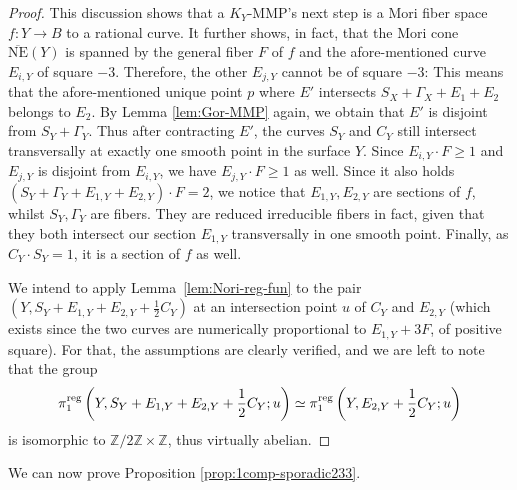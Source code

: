 \documentclass{amsart}
\newcommand{\zz}{\mathbb{Z}}
\theoremstyle{definition}
\theoremstyle{remark}
\numberwithin{equation}{section}
\begin{document}
\begin{proof}
This discussion shows that a $K_Y$-MMP's next step is a Mori fiber space $f\colon Y\rightarrow B$ to a rational curve. It further shows, in fact, that the Mori cone $\overline{\mathrm{NE}}(Y)$ is spanned by the general fiber $F$ of $f$ and the afore-mentioned curve $E_{i,Y}$ of square $-3$. Therefore, the other $E_{j,Y}$ cannot be of square $-3$: This means that the afore-mentioned unique point $p$ where $E'$ intersects $S_X+\Gamma_X+E_1+E_2$ belongs to $E_2$. By Lemma \ref{lem:Gor-MMP} again, we obtain that $E'$ is disjoint from $S_Y+\Gamma_Y$. Thus after contracting $E'$, the curves $S_Y$ and $C_Y$ still intersect transversally at exactly one smooth point in the surface $Y$.
Since $E_{i,Y}\cdot F\ge 1$ and $E_{j,Y}$ is disjoint from $E_{i,Y}$, we have $E_{j,Y}\cdot F\ge 1$ as well. Since it also holds
$(S_Y+\Gamma_Y+E_{1,Y}+E_{2,Y})\cdot F = 2$, we notice that $E_{1,Y},E_{2,Y}$ are sections of $f$, whilst $S_Y,\Gamma_Y$ are fibers. They are reduced irreducible fibers in fact, given that they both intersect our section $E_{1,Y}$ transversally in one smooth point. Finally, as $C_Y\cdot S_Y = 1$, it is a section of $f$ as well. 

We intend to apply Lemma~\ref{lem:Nori-reg-fun} to the pair $(Y,S_Y+E_{1,Y}+E_{2,Y}+\frac{1}{2}C_Y)$ at an intersection point $u$ of $C_Y$ and $E_{2,Y}$ (which exists since the two curves are numerically proportional to $E_{1,Y}+3F$, of positive square).
For that, the assumptions are clearly verified, and we are left to note that the group $$\pi_1^{\rm reg}\left(Y,S_Y+E_{1,Y}+E_{2,Y}+\frac{1}{2}C_Y;u\right)\simeq \pi_1^{\rm reg}\left(Y,E_{2,Y}+\frac{1}{2}C_Y;u\right)$$ 
is isomorphic to $\zz/2\zz\times\zz$, thus virtually abelian.
\end{proof}

We can now prove Proposition \ref{prop:1comp-sporadic233}.
\end{document}
